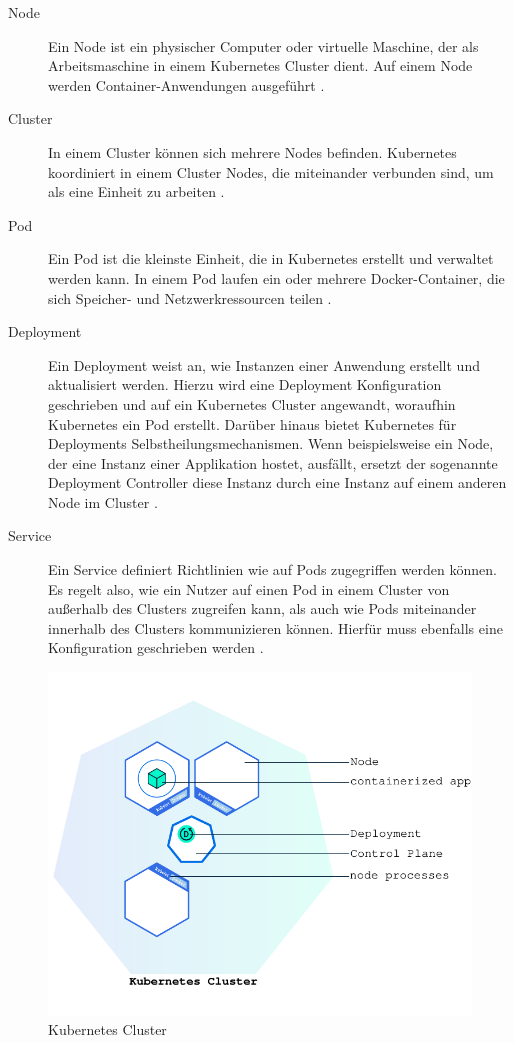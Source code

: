 \begin{description}
  \item[Node] Ein Node ist ein physischer Computer oder virtuelle Maschine, der als Arbeitsmaschine in einem Kubernetes Cluster dient. Auf einem Node werden Container-Anwendungen ausgeführt \citep{kubernetesclusternode:2019}. 
  \item[Cluster] In einem Cluster können sich mehrere Nodes befinden. Kubernetes koordiniert in einem Cluster Nodes, die miteinander verbunden sind, um als eine Einheit zu arbeiten \citep{kubernetesclusternode:2019}.
  \item[Pod] Ein Pod ist die kleinste Einheit, die in Kubernetes erstellt und verwaltet werden kann. In einem Pod laufen ein oder mehrere Docker-Container, die sich Speicher- und Netzwerkressourcen teilen \citep{kubernetespods:2021}.  
  \item[Deployment] Ein Deployment weist an, wie Instanzen einer Anwendung erstellt und aktualisiert werden. Hierzu wird eine Deployment Konfiguration geschrieben und auf ein Kubernetes Cluster angewandt, woraufhin Kubernetes ein Pod erstellt. Darüber hinaus bietet Kubernetes für Deployments Selbstheilungsmechanismen. Wenn beispielsweise ein Node, der eine Instanz einer Applikation hostet, ausfällt, ersetzt der sogenannte Deployment Controller diese Instanz durch eine Instanz auf einem anderen Node im Cluster \citep{kubernetesdeployment:2021}.
  \item[Service] Ein Service definiert Richtlinien wie auf Pods zugegriffen werden können. Es regelt also, wie ein Nutzer auf einen Pod in einem Cluster von außerhalb des Clusters zugreifen kann, als auch wie Pods miteinander innerhalb des Clusters kommunizieren können. Hierfür muss ebenfalls eine Konfiguration geschrieben werden \citep{kubernetesservice:2021}. 
\end{description}

\begin{figure}[!htb]
  \centering
  \includegraphics[width=1.0\textwidth]{gfx/module_02_first_app.pdf}
  \caption[Kubernetes Cluster]{Kubernetes Cluster \citep{kubernetesdeployment:2021}}
  \label{fig:chapter02:KubernetesCluster}
\end{figure}

